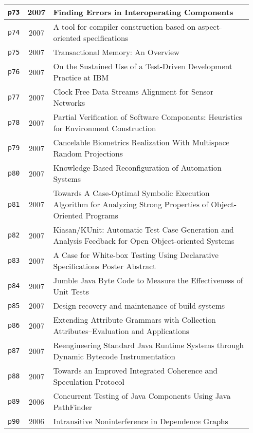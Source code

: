 \begin{longtable}{| c | c | p{16cm} |}
  \hline
  \texttt{p73} & 2007 & Finding Errors in Interoperating Components \\
  \hline
  \texttt{p74} & 2007 & A tool for compiler construction based on aspect-oriented specifications \\
  \hline
  \texttt{p75} & 2007 & Transactional Memory: An Overview \\
  \hline
  \texttt{p76} & 2007 & On the Sustained Use of a Test-Driven Development Practice at IBM \\
  \hline
  \texttt{p77} & 2007 & Clock Free Data Streams Alignment for Sensor Networks \\
  \hline
  \texttt{p78} & 2007 & Partial Verification of Software Components: Heuristics for Environment Construction \\
  \hline
  \texttt{p79} & 2007 & Cancelable Biometrics Realization With Multispace Random Projections \\
  \hline
  \texttt{p80} & 2007 & Knowledge-Based Reconfiguration of Automation Systems \\
  \hline
  \texttt{p81} & 2007 & Towards A Case-Optimal Symbolic Execution Algorithm for Analyzing Strong Properties of Object-Oriented Programs \\
  \hline
  \texttt{p82} & 2007 & Kiasan/KUnit: Automatic Test Case Generation and Analysis Feedback for Open Object-oriented Systems \\
  \hline
  \texttt{p83} & 2007 & A Case for White-box Testing Using Declarative Specifications Poster Abstract \\
  \hline
  \texttt{p84} & 2007 & Jumble Java Byte Code to Measure the Effectiveness of Unit Tests \\
  \hline
  \texttt{p85} & 2007 & Design recovery and maintenance of build systems \\
  \hline
  \texttt{p86} & 2007 & Extending Attribute Grammars with Collection Attributes--Evaluation and Applications \\
  \hline
  \texttt{p87} & 2007 & Reengineering Standard Java Runtime Systems through Dynamic Bytecode Instrumentation \\
  \hline
  \texttt{p88} & 2007 & Towards an Improved Integrated Coherence and Speculation Protocol \\
  \hline
  \texttt{p89} & 2006 & Concurrent Testing of Java Components Using Java PathFinder \\
  \hline
  \texttt{p90} & 2006 & Intransitive Noninterference in Dependence Graphs \\
  \hline

\end{longtable}
